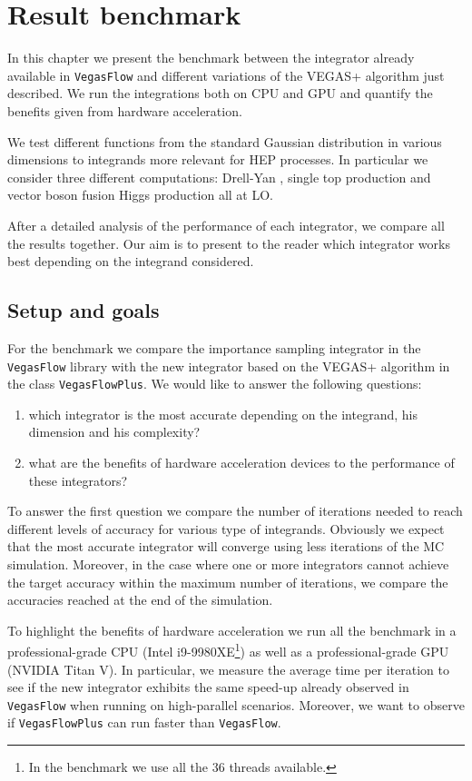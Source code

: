 \documentclass[../main/main.tex]{subfiles}
\begin{document}
\chapter{Result benchmark}
	
In this chapter we present the benchmark between the integrator already available in \texttt{VegasFlow} and different variations of the VEGAS+ algorithm just described. We run the integrations both on CPU and GPU and quantify the benefits given from hardware acceleration.

We test different functions from the standard Gaussian distribution in various dimensions to integrands more relevant for HEP processes. In particular we consider three different computations: Drell-Yan \cite{Carrazza_2020}, single top production \cite{Brucherseifer_2014} and vector boson fusion Higgs production \cite{Carrazza_2021} all at LO.

After a detailed analysis of the performance of each integrator, we compare all the results together. Our aim is to present to the reader which integrator works best depending on the integrand considered.
\section{Setup and goals}
For the benchmark we compare the importance sampling integrator in the \texttt{VegasFlow} library with the new integrator based on the VEGAS+ algorithm  in the class \texttt{VegasFlowPlus}.
We would like to answer the following questions:
\begin{enumerate}
	\item which integrator is the most accurate depending on the integrand, his dimension and his complexity?
	\item what are the benefits of hardware acceleration devices to the performance of these integrators?
\end{enumerate}

To answer the first question we compare the number of iterations needed to reach different levels of accuracy for various type of integrands.
Obviously we expect that the most accurate integrator will converge using less iterations of the MC simulation. Moreover, in the case where one or more integrators cannot achieve the target accuracy within the maximum number of iterations, we compare the accuracies reached at the end of the simulation.

To highlight the benefits of hardware acceleration we run all the benchmark in a professional-grade CPU (Intel i9-9980XE\footnote{In the benchmark we use all the 36 threads available.}) as well as a professional-grade GPU (NVIDIA Titan V). In particular, we measure the average time per iteration to see if the new integrator exhibits the same speed-up already observed in \texttt{VegasFlow} when running on 
high-parallel scenarios. Moreover, we want to observe if \texttt{VegasFlowPlus} can run faster than \texttt{VegasFlow}.
\end{document}
